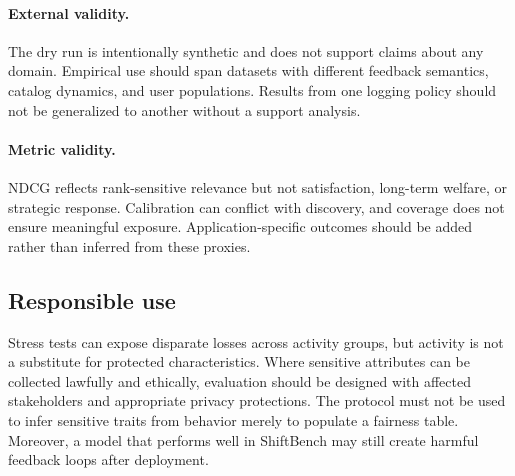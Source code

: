 \paragraph{External validity.}
The dry run is intentionally synthetic and does not support claims about any
domain.  Empirical use should span datasets with different feedback semantics,
catalog dynamics, and user populations.  Results from one logging policy should
not be generalized to another without a support analysis.

\paragraph{Metric validity.}
NDCG reflects rank-sensitive relevance but not satisfaction, long-term welfare,
or strategic response.  Calibration can conflict with discovery, and coverage
does not ensure meaningful exposure.  Application-specific outcomes should be
added rather than inferred from these proxies.

\subsection{Responsible use}

Stress tests can expose disparate losses across activity groups, but activity is
not a substitute for protected characteristics.  Where sensitive attributes can
be collected lawfully and ethically, evaluation should be designed with affected
stakeholders and appropriate privacy protections.  The protocol must not be used
to infer sensitive traits from behavior merely to populate a fairness table.
Moreover, a model that performs well in ShiftBench may still create harmful
feedback loops after deployment.
